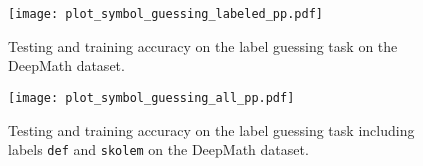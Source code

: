 \documentclass{ecai}
\newcommand{\nbc}[3]{
                {\colorbox{#3}{\bfseries\sffamily\scriptsize\textcolor{white}{#1}}}
                {\textcolor{#3}{\sffamily\small$\blacktriangleright$\textit{#2}$\blacktriangleleft$}}
}
\newcommand{\todoat}[2]{\nbc{TODO: #1}{#2}{todocolor}}
\begin{document}
\begin{figure}
\centering
  \centering
    \texttt{[image: plot\_symbol\_guessing\_labeled\_pp.pdf]}
\caption{Testing and training accuracy on the label guessing task on the DeepMath dataset.}
    \label{fig:symbol_guess_labeled}
  \end{figure}
\begin{figure}
  \centering
    \texttt{[image: plot\_symbol\_guessing\_all\_pp.pdf]}
    \caption{Testing and training accuracy on the label guessing task including labels \texttt{def} and \texttt{skolem} on the DeepMath dataset.}
    \label{fig:symbol_guess_all}
\end{figure}





\end{document}

